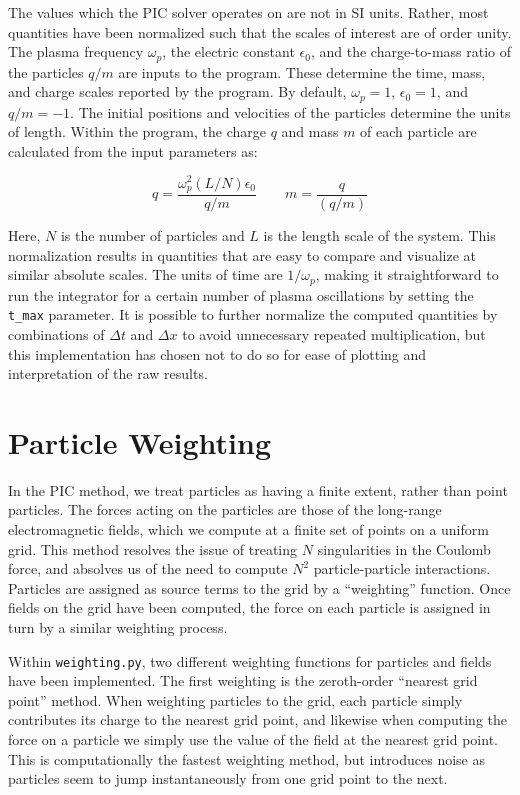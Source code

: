 \documentclass[%
 reprint,
 amsmath,amssymb,
 aps,
]{revtex4-2}
\begin{document}
The values which the PIC solver operates on are not in SI units. Rather, most quantities have been normalized such that the scales of interest are of order unity. The plasma frequency $\omega_p$, the electric constant $\epsilon_0$, and the charge-to-mass ratio of the particles $q/m$ are inputs to the program. These determine the time, mass, and charge scales reported by the program. By default, $\omega_p = 1$, $\epsilon_0 = 1$, and $q/m = -1$. The initial positions and velocities of the particles determine the units of length. Within the program, the charge $q$ and mass $m$ of each particle are calculated from the input parameters as:

\begin{equation}
q = \frac{\omega_p ^2 (L/N) \epsilon_0}{q/m} \qquad m = \frac{q}{(q/m)}
\end{equation}

Here, $N$ is the number of particles and $L$ is the length scale of the system. This normalization results in quantities that are easy to compare and visualize at similar absolute scales. The units of time are $1/\omega_p$, making it straightforward to run the integrator for a certain number of plasma oscillations by setting the \texttt{t\_max} parameter. It is possible to further normalize the computed quantities by combinations of $\Delta t$ and $\Delta x$ to avoid unnecessary repeated multiplication, but this implementation has chosen not to do so for ease of plotting and interpretation of the raw results.

\section{Particle Weighting}

In the PIC method, we treat particles as having a finite extent, rather than point particles. The forces acting on the particles are those of the long-range electromagnetic fields, which we compute at a finite set of points on a uniform grid. This method resolves the issue of treating $N$ singularities in the Coulomb force, and absolves us of the need to compute $N^2$ particle-particle interactions. Particles are assigned as source terms to the grid by a ``weighting'' function. Once fields on the grid have been computed, the force on each particle is assigned in turn by a similar weighting process.

Within \texttt{weighting.py}, two different weighting functions for particles and fields have been implemented. The first weighting is the zeroth-order ``nearest grid point'' method. When weighting particles to the grid, each particle simply contributes its charge to the nearest grid point, and likewise when computing the force on a particle we simply use the value of the field at the nearest grid point. This is computationally the fastest weighting method, but introduces noise as particles seem to jump instantaneously from one grid point to the next.
\end{document}
